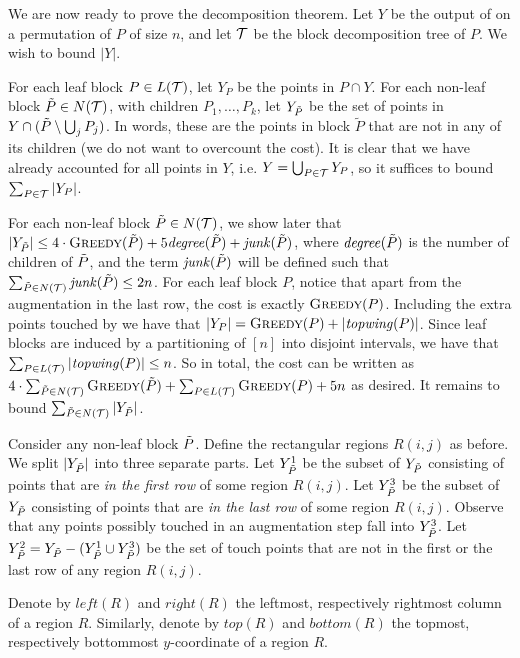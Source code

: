 

We are now ready to prove the decomposition theorem. Let $Y$ be the output of \agreedy on a permutation of $P$ of size $n$, and let ${\mathcal T}$ be the block decomposition tree of $P$. We wish to bound $|Y|$. 

For each leaf block $P \in L({\mathcal T})$, let $Y_P$ be the points in  $P \cap Y$.  
For each non-leaf block $\tilde{P} \in N({\mathcal T})$, with children $P_1,\ldots, P_k$, let $Y_{\tilde{P}}$ be the set of points in $Y \cap (\tilde{P} \setminus \bigcup_{j} P_j)$. In words, these are the points in block ${\tilde{P}}$ that are not in any of its children (we do not want to overcount the cost). It is clear that we have already accounted for all points in $Y$, i.e. $Y = \bigcup_{P \in {\mathcal T}} Y_P$, so it suffices to bound $\sum_{P \in {\mathcal T}} |Y_P|$. 

For each non-leaf block $\tilde{P}  \in N({\mathcal T})$, we show later that $|Y_{\tilde{P}}| \leq 4 \cdot \textsc{Greedy}(\tilde{P}) + 5\mathit{degree}(\tilde{P}) + \mathit{junk}(\tilde{P})$, where $\mathit{degree}(\tilde{P})$ is the number of children of $\tilde{P}$, and the 
term $\mathit{junk}(\tilde{P})$ will be defined such that $\sum_{\tilde{P} \in N({\mathcal T})}\mathit{junk}(\tilde{P}) \leq 2n$.
For each leaf block $P$, notice that apart from the \agreedy augmentation in the last row, the cost is exactly $\textsc{Greedy}(P)$. Including the extra points touched by \agreedy we have that $|Y_P| = \textsc{Greedy}(P) + |\mathit{topwing}(P)|$. Since leaf blocks are induced by a partitioning of $[n]$ into disjoint intervals, we have that $\sum_{P \in L({\mathcal T})}{|\mathit{topwing}(P)|} \leq n$. So in total, the cost can be written as $4 \cdot \sum_{{\tilde{P}} \in N({\mathcal T})}\textsc{Greedy}({\tilde{P}}) + \sum_{P \in L({\mathcal T})}\textsc{Greedy}(P) + 5n$ as desired.
It remains to bound $\sum_{\tilde{P} \in N({\mathcal T})}{|Y_{\tilde{P}}|}$.

Consider any non-leaf block $\tilde{P}$. Define the rectangular regions $R(i,j)$ as before. We split $\lvert Y_{\tilde{P}}\rvert$ into three separate parts. Let $Y_{\tilde{P}}^1$ be the subset of $Y_{\tilde{P}}$ consisting of points that are \emph{in the first row} of some region $R(i,j)$. Let $Y_{\tilde{P}}^3$ be the subset of $Y_{\tilde{P}}$ consisting of points that are \emph{in the last row} of some region $R(i,j)$. Observe that any points possibly touched in an \agreedy augmentation step fall into $Y_{\tilde{P}}^3$. Let $Y_{\tilde{P}}^2 = Y_{\tilde{P}} - (Y_{\tilde{P}}^1 \cup Y_{\tilde{P}}^3)$ be the set of touch points that are not in the first or the last row of any region $R(i,j)$. 

Denote by $\textit{left}(R)$ and $\textit{right}(R)$ the leftmost, respectively rightmost column of a region $R$. Similarly, denote by $\textit{top}(R)$ and $\textit{bottom}(R)$ the topmost, respectively bottommost $y$-coordinate of a region $R$.

